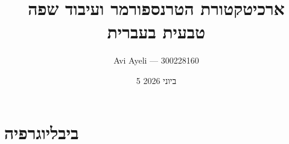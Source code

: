 \documentclass[12pt,a4paper]{report}
\title{ארכיטקטורת הטרנספורמר ועיבוד שפה טבעית בעברית}
\author{Avi Ayeli --- 300228160}
\date{5 ביוני \textenglish{2026}}
\begin{document}
\maketitle
\tableofcontents
\newpage








\newpage
\chapter*{ביבליוגרפיה}
\begin{english}
\sloppy
\printbibliography[heading=none]
\end{english}
\end{document}
